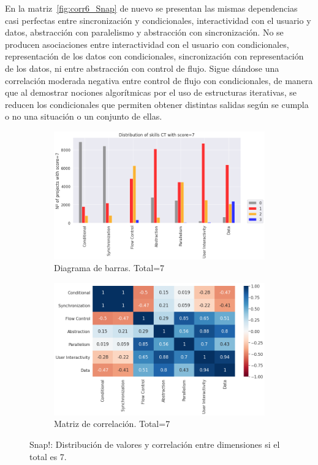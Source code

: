 \documentclass[a4paper, 12pt]{book}
\begin{document}
En la matriz~\ref{fig:corr6_Snap} de nuevo se presentan las mismas dependencias casi perfectas entre sincronización y condicionales, interactividad con el usuario y datos, abstracción con paralelismo y abstracción con sincronización. No se producen asociaciones entre interactividad con el usuario con condicionales, representación de los datos con condicionales, sincronización con representación de los datos, ni entre abstracción con control de flujo. Sigue dándose una correlación moderada negativa entre control de flujo con condicionales, de manera que al demostrar nociones algorítmicas por el uso de estructuras iterativas, se reducen los condicionales que permiten obtener distintas salidas según se cumpla o no una situación o un conjunto de ellas.

\begin{figure}[H]
    \centering
    \begin{subfigure}[h]{.49\textwidth} 
        \includegraphics[width=\textwidth]{img/distribucion_7_Snap}
        \caption{Diagrama de barras. Total=7}
        \label{fig:total7_Snap}
    \end{subfigure}       
    \begin{subfigure}[h]{.49\textwidth} 
        \includegraphics[width=\textwidth]{img/corr_7_Snap}
        \caption{Matriz de correlación. Total=7}
        \label{fig:corr7_Snap}
    \end{subfigure}
    \caption{Snap!: Distribución de valores y correlación entre dimensiones si el total es 7.}
\end{figure}
\end{document}

